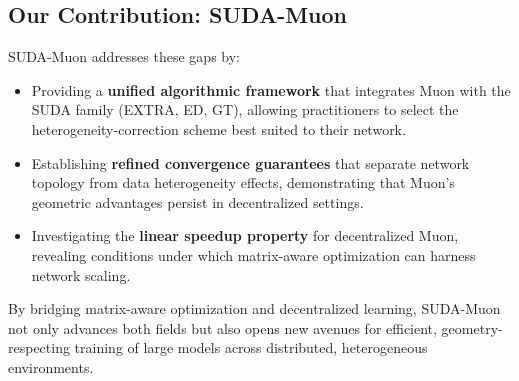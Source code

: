 \subsection{Our Contribution: SUDA-Muon}

SUDA-Muon addresses these gaps by:
\begin{itemize}
    \item Providing a \textbf{unified algorithmic framework} that integrates Muon with the SUDA family (EXTRA, ED, GT), allowing practitioners to select the heterogeneity-correction scheme best suited to their network.
    \item Establishing \textbf{refined convergence guarantees} that separate network topology from data heterogeneity effects, demonstrating that Muon's geometric advantages persist in decentralized settings.
    \item Investigating the \textbf{linear speedup property} for decentralized Muon, revealing conditions under which matrix-aware optimization can harness network scaling.
\end{itemize}

By bridging matrix-aware optimization and decentralized learning, SUDA-Muon not only advances both fields but also opens new avenues for efficient, geometry-respecting training of large models across distributed, heterogeneous environments.